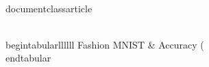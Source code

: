 \\documentclass{article}
\begin{document}
\\begin{tabular}{llllll}
Fashion MNIST & Accuracy (%
\\end{tabular}
\
\end{document}
